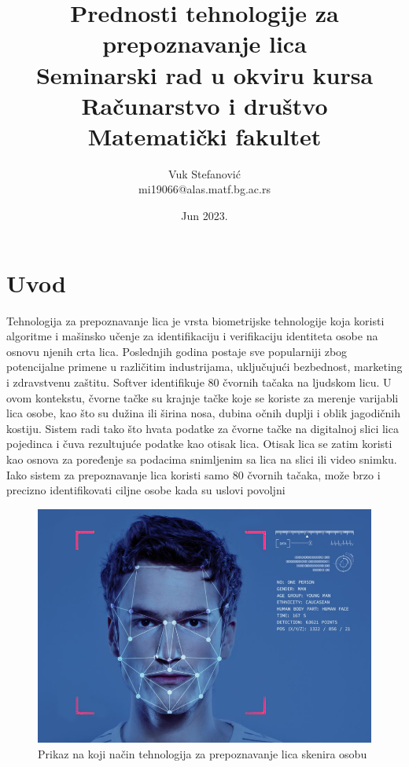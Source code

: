 \documentclass[a4paper]{article}
\begin{document}
\title{Prednosti tehnologije za prepoznavanje lica\\ \small{Seminarski rad u okviru kursa\\Računarstvo i društvo\\ Matematički fakultet}}

\author{Vuk Stefanović\\ mi19066@alas.matf.bg.ac.rs}
\date{Jun 2023.}
\maketitle

\tableofcontents

\newpage

\section{Uvod}
\label{sec:uvod}
Tehnologija za prepoznavanje lica je vrsta biometrijske tehnologije koja koristi algoritme i mašinsko učenje za identifikaciju i verifikaciju identiteta osobe na osnovu njenih crta lica. Poslednjih godina postaje sve popularniji zbog potencijalne primene u različitim industrijama, uključujući bezbednost, marketing i zdravstvenu zaštitu. Softver identifikuje 80 čvornih tačaka na ljudskom licu. U ovom kontekstu, čvorne tačke su krajnje tačke koje se koriste za merenje varijabli lica osobe, kao što su dužina ili širina nosa, dubina očnih duplji i oblik jagodičnih kostiju. Sistem radi tako što hvata podatke za čvorne tačke na digitalnoj slici lica pojedinca i čuva rezultujuće podatke kao otisak lica. Otisak lica se zatim koristi kao osnova za poređenje sa podacima snimljenim sa lica na slici ili video snimku. Iako sistem za prepoznavanje lica koristi samo 80 čvornih tačaka, može brzo i precizno identifikovati ciljne osobe kada su uslovi povoljni
\begin{figure}[h!]
	\begin{center}
		\includegraphics[scale=0.2]{image1.png}
	\end{center}
	\caption{Prikaz na koji način tehnologija za prepoznavanje lica skenira osobu}
\end{figure}
\end{document}
